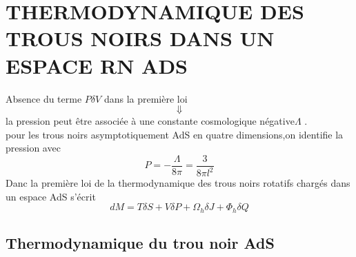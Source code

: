 \documentclass{beamer}
\begin{document}
\section{THERMODYNAMIQUE DES TROUS NOIRS DANS UN ESPACE RN ADS}
	\begin{frame}
Absence du terme $ P\delta V$ dans la
première loi $$\Downarrow$$ la pression peut \^{e}tre associée à une constante cosmologique négative$\Lambda$ .\\
pour les trous noirs asymptotiquement AdS
en quatre dimensions,on identifie la pression avec
$$P=-\dfrac{\Lambda}{8\pi}=\dfrac{3}{8\pi l^{2}}$$
Danc la première loi de la thermodynamique des trous
noirs rotatifs chargés dans un espace AdS s'écrit
$$dM=T\delta S+V\delta P+\Omega_{h}\delta J+\Phi_{h}\delta Q$$
\end{frame}

	\subsection{Thermodynamique du trou noir  AdS}
\end{document}

